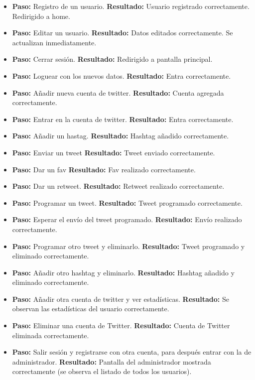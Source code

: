 \documentclass[a4paper]{article}
\begin{document}
\begin{itemize}
	\item \textbf{Paso: }Registro de un usuario. \textbf{Resultado:} Usuario registrado correctamente. Redirigido a home.
	\item \textbf{Paso: }Editar un usuario. \textbf{Resultado: }Datos editados correctamente. Se actualizan inmediatamente.
	\item \textbf{Paso: }Cerrar sesión. \textbf{Resultado: }Redirigido a pantalla principal.
	\item \textbf{Paso: }Loguear con los nuevos datos. \textbf{Resultado: }Entra correctamente.
	\item \textbf{Paso: }Añadir nueva cuenta de twitter. \textbf{Resultado: }Cuenta agregada correctamente.
	\item \textbf{Paso: }Entrar en la cuenta de twitter. \textbf{Resultado: }Entra correctamente.
	\item \textbf{Paso: }Añadir un hastag. \textbf{Resultado: }Hashtag añadido correctamente.
	\item \textbf{Paso: }Enviar un tweet \textbf{Resultado: }Tweet enviado correctamente.
	\item \textbf{Paso: }Dar un fav \textbf{Resultado: }Fav realizado correctamente.
    \item \textbf{Paso: }Dar un retweet. \textbf{Resultado: }Retweet realizado correctamente.
    \item \textbf{Paso: }Programar un tweet. \textbf{Resultado: }Tweet programado correctamente.
    \item \textbf{Paso: }Esperar el envío del tweet programado. \textbf{Resultado: }Envío realizado correctamente.
    \item \textbf{Paso: }Programar otro tweet y eliminarlo. \textbf{Resultado: }Tweet programado y eliminado correctamente.
    \item \textbf{Paso: }Añadir otro hashtag y eliminarlo. \textbf{Resultado: }Hashtag añadido y eliminado correctamente.
    \item \textbf{Paso: }Añadir otra cuenta de twitter y ver estadísticas. \textbf{Resultado: }Se observan las estadísticas del usuario correctamente.
    \item \textbf{Paso: }Eliminar una cuenta de Twitter. \textbf{Resultado: }Cuenta de Twitter eliminada correctamente.
    \item \textbf{Paso: }Salir sesión y registrarse con otra cuenta, para después entrar con la de administrador. \textbf{Resultado: }Pantalla del administrador mostrada correctamente (se observa el listado de todos los usuarios).

\end{itemize}
\end{document}
